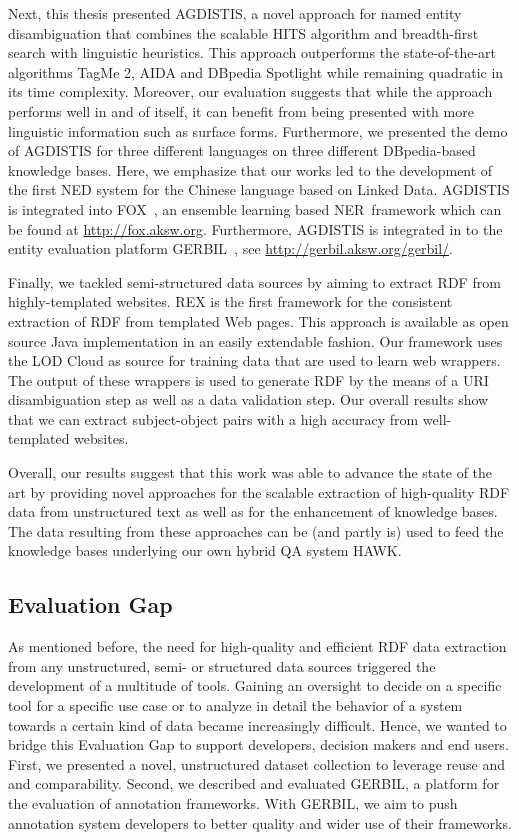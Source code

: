 Next, this thesis presented AGDISTIS, a novel approach for named entity disambiguation that combines the scalable \ac{HITS} algorithm and breadth-first search with linguistic heuristics.
This approach outperforms the state-of-the-art algorithms TagMe 2, AIDA and DBpedia Spotlight while remaining quadratic in its time complexity. 
Moreover, our evaluation suggests that while the approach performs well in and of itself, it can benefit from being presented with more linguistic information such as surface forms. 
Furthermore, we presented the demo of AGDISTIS for three different languages on three different DBpedia-based knowledge bases.
Here,  we emphasize that our works led to the development of the first \ac{NED} system for the Chinese language based on Linked Data.
AGDISTIS is integrated into FOX~\cite{FOX}, an ensemble learning based \ac{NER}~framework which can be found at \url{http://fox.aksw.org}. 
Furthermore, AGDISTIS is integrated in to the entity evaluation platform GERBIL~\cite{GERBIL}, see \url{http://gerbil.aksw.org/gerbil/}.


Finally, we tackled semi-structured data sources by aiming to extract \ac{RDF} from highly-templated websites. 
REX is the first framework for the consistent extraction of \ac{RDF} from templated Web pages. 
This approach is available as open source Java implementation in an easily extendable fashion.
Our framework uses the \ac{LOD} Cloud as source for training data that are used to learn web wrappers. 
The output of these wrappers is used to generate \ac{RDF} by the means of a URI disambiguation step as well as a data validation step.
Our overall results show that we can extract subject-object pairs with a high accuracy from well-templated websites.

Overall, our results suggest that this work was able to advance the state of the art by providing novel approaches for the scalable extraction of high-quality RDF data from unstructured text as well as for the enhancement of knowledge bases. 
The data resulting from these approaches can be (and partly is) used to feed the knowledge bases underlying our own hybrid \ac{QA} system HAWK. 


\subsection*{Evaluation Gap}

As mentioned before, the need for high-quality and efficient RDF data extraction from any unstructured, semi- or structured data sources triggered the development of a multitude of tools. 
Gaining an oversight to decide on a specific tool for a specific use case or to analyze in detail the behavior of  a system towards a certain kind of data became increasingly difficult.
Hence, we wanted to bridge this Evaluation Gap to  support developers, decision makers and end users.
First, we presented a novel, unstructured dataset collection to leverage reuse and and comparability. 
Second, we described and evaluated GERBIL, a platform for the evaluation of annotation frameworks. With GERBIL, we aim to push annotation system developers to better quality and wider use of their frameworks.

